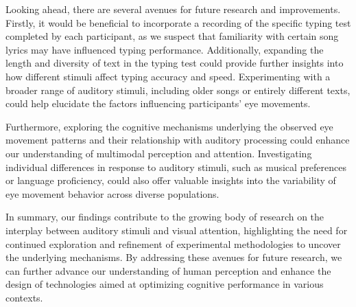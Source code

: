 \documentclass[manuscript, screen, review]{acmart} %
\begin{document}
Looking ahead, there are several avenues for future research and improvements. Firstly, it would be beneficial to incorporate a recording of the specific typing test completed by each participant, as we suspect that familiarity with certain song lyrics may have influenced typing performance. Additionally, expanding the length and diversity of text in the typing test could provide further insights into how different stimuli affect typing accuracy and speed. Experimenting with a broader range of auditory stimuli, including older songs or entirely different texts, could help elucidate the factors influencing participants' eye movements.

Furthermore, exploring the cognitive mechanisms underlying the observed eye movement patterns and their relationship with auditory processing could enhance our understanding of multimodal perception and attention. Investigating individual differences in response to auditory stimuli, such as musical preferences or language proficiency, could also offer valuable insights into the variability of eye movement behavior across diverse populations.

In summary, our findings contribute to the growing body of research on the interplay between auditory stimuli and visual attention, highlighting the need for continued exploration and refinement of experimental methodologies to uncover the underlying mechanisms. By addressing these avenues for future research, we can further advance our understanding of human perception and enhance the design of technologies aimed at optimizing cognitive performance in various contexts.
\end{document}
